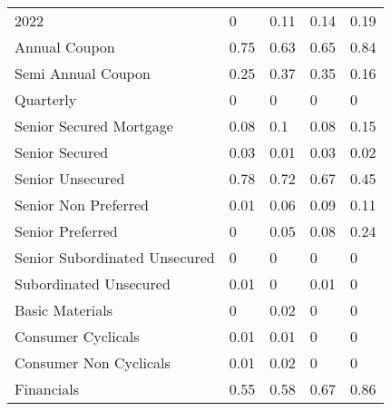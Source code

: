 \begin{table}[H]
\begin{tabular}{lllll}
2022 & \cellcolor[HTML]{FCFCFF}0 & \cellcolor[HTML]{E9F5EF}0.11 & \cellcolor[HTML]{E4F2EA}0.14 & \cellcolor[HTML]{DBEFE2}0.19 \\
Annual Coupon & \cellcolor[HTML]{77C68C}0.75 & \cellcolor[HTML]{8CCF9F}0.63 & \cellcolor[HTML]{89CE9C}0.65 & \cellcolor[HTML]{67C07F}0.84 \\
Semi Annual   Coupon & \cellcolor[HTML]{D0EAD9}0.25 & \cellcolor[HTML]{BBE2C7}0.37 & \cellcolor[HTML]{BEE3CA}0.35 & \cellcolor[HTML]{E0F1E7}0.16 \\
Quarterly & \cellcolor[HTML]{FCFCFF}0 & \cellcolor[HTML]{FCFCFF}0 & \cellcolor[HTML]{FCFCFF}0 & \cellcolor[HTML]{FCFCFF}0 \\
Senior   Secured Mortgage & \cellcolor[HTML]{EEF7F3}0.08 & \cellcolor[HTML]{EBF5F0}0.1 & \cellcolor[HTML]{EEF7F3}0.08 & \cellcolor[HTML]{E2F2E8}0.15 \\
Senior Secured & \cellcolor[HTML]{F7FAFB}0.03 & \cellcolor[HTML]{FBFCFE}0.01 & \cellcolor[HTML]{F7FAFB}0.03 & \cellcolor[HTML]{F9FBFC}0.02 \\
Senior Unsecured & \cellcolor[HTML]{72C488}0.78 & \cellcolor[HTML]{7CC991}0.72 & \cellcolor[HTML]{85CC99}0.67 & \cellcolor[HTML]{ACDCBA}0.45 \\
Senior Non   Preferred & \cellcolor[HTML]{FBFCFE}0.01 & \cellcolor[HTML]{F2F8F6}0.06 & \cellcolor[HTML]{ECF6F2}0.09 & \cellcolor[HTML]{E9F5EF}0.11 \\
Senior Preferred & \cellcolor[HTML]{FCFCFF}0 & \cellcolor[HTML]{F4F9F8}0.05 & \cellcolor[HTML]{EEF7F3}0.08 & \cellcolor[HTML]{D2EBDB}0.24 \\
Senior   Subordinated Unsecured & \cellcolor[HTML]{FCFCFF}0 & \cellcolor[HTML]{FCFCFF}0 & \cellcolor[HTML]{FCFCFF}0 & \cellcolor[HTML]{FCFCFF}0 \\
Subordinated   Unsecured & \cellcolor[HTML]{FBFCFE}0.01 & \cellcolor[HTML]{FCFCFF}0 & \cellcolor[HTML]{FBFCFE}0.01 & \cellcolor[HTML]{FCFCFF}0 \\
Basic Materials & \cellcolor[HTML]{FCFCFF}0 & \cellcolor[HTML]{F9FBFC}0.02 & \cellcolor[HTML]{FCFCFF}0 & \cellcolor[HTML]{FCFCFF}0 \\
Consumer   Cyclicals & \cellcolor[HTML]{FBFCFE}0.01 & \cellcolor[HTML]{FBFCFE}0.01 & \cellcolor[HTML]{FCFCFF}0 & \cellcolor[HTML]{FCFCFF}0 \\
Consumer   Non Cyclicals & \cellcolor[HTML]{FBFCFE}0.01 & \cellcolor[HTML]{F9FBFC}0.02 & \cellcolor[HTML]{FCFCFF}0 & \cellcolor[HTML]{FCFCFF}0 \\
Financials & \cellcolor[HTML]{9BD5AB}0.55 & \cellcolor[HTML]{95D3A6}0.58 & \cellcolor[HTML]{85CC99}0.67 & \cellcolor[HTML]{63BE7B}0.86 \\

\end{tabular}
\end{table}
